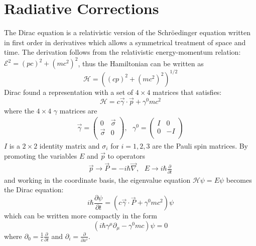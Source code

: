 \documentclass{outhesis}
\begin{document}
  \chapter{Radiative Corrections}
 \label{app:schwinger}
The Dirac equation is a relativistic version of the Schr\"{o}edinger equation written in first order in derivatives which allows a symmetrical treatment of space and time. The derivation follows from the relativistic energy-momentum relation: $\mathcal{E}^2 = (pc)^2+(mc^2)^2$, thus the Hamiltonian can be written as
\[
\mathcal{H} = \left( (cp)^2 + (mc^2)^2 \right)^{1/2}
\]
Dirac found a representation with a set of $4\times4$ matrices that satisfies:
\begin{equation}
\label{eq:H}
\mathcal{H} = c \overrightarrow{\gamma}\cdot \overrightarrow{p} + \gamma^0mc^2
\end{equation}
where the $4\times4 \,\,\gamma$ matrices are
\begin{equation}
\begin{split}
\overrightarrow{\gamma} =
\begin{pmatrix}
0 & \overrightarrow{\sigma} \\
\overrightarrow{\sigma} & 0 \\
\end{pmatrix} 
, \,\,\,\,
\gamma^0 =
\begin{pmatrix}
I & 0 \\
0 & -I \\
\end{pmatrix} 
\end{split}
\end{equation}
$I$ is a $2\times2$ identity matrix and $\sigma_i$ for $i=1,2,3$ are the Pauli spin matrices.
By promoting the variables $E$ and $\overrightarrow{p}$ to operators 
\[
\begin{split}
\overrightarrow{p} \to \overrightarrow{P}=-i\hbar\overrightarrow{\nabla},
\,\,\,\,
E \to i\hbar \frac{\partial }{\partial t}
\end{split}
\]
and working in the coordinate basis, the eigenvalue equation $\mathcal{H}  \psi = E \psi$ becomes the Dirac equation:
\begin{equation}
\label{eq:eig}
i\hbar \frac{\partial \psi}{\partial t} = \left(  c \overrightarrow{\gamma}\cdot \overrightarrow{P} + \gamma^0mc^2  \right) \psi
\end{equation}
which can be written more compactly in the form
\begin{equation}
\left(i\hbar \gamma^{\mu}\partial_{\mu}-\gamma^0mc\right) \psi = 0
\end{equation}
where $\partial_0 =  \frac{1}{c}\frac{\partial}{\partial t}$ and $\partial_i =  \frac{\partial}{\partial x^i}$.
\end{document}
